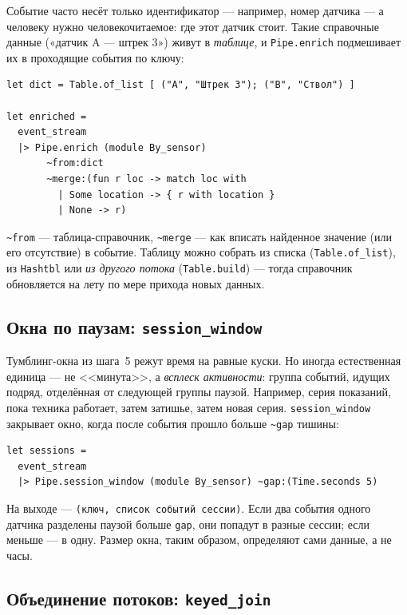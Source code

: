 \documentclass[11pt,a4paper]{article}
\begin{document}
Событие часто несёт только идентификатор --- например, номер датчика
--- а человеку нужно человекочитаемое: где этот датчик стоит. Такие
справочные данные («датчик A --- штрек 3») живут в \emph{таблице}, и
\texttt{Pipe.enrich} подмешивает их в проходящие события по ключу:

\begin{lstlisting}
let dict = Table.of_list [ ("A", "Штрек 3"); ("B", "Ствол") ]

let enriched =
  event_stream
  |> Pipe.enrich (module By_sensor)
       ~from:dict
       ~merge:(fun r loc -> match loc with
         | Some location -> { r with location }
         | None -> r)
\end{lstlisting}

\texttt{\textasciitilde{}from} --- таблица-справочник, \texttt{\textasciitilde{}merge}
--- как вписать найденное значение (или его отсутствие) в событие.
Таблицу можно собрать из списка (\texttt{Table.of\_list}), из
\texttt{Hashtbl} или \emph{из другого потока} (\texttt{Table.build}) ---
тогда справочник обновляется на лету по мере прихода новых данных.

\subsection{Окна по паузам: \texttt{session\_window}}

Тумблинг-окна из шага~5 режут время на равные куски. Но иногда
естественная единица --- не <<минута>>, а \emph{всплеск активности}:
группа событий, идущих подряд, отделённая от следующей группы паузой.
Например, серия показаний, пока техника работает, затем затишье, затем
новая серия. \texttt{session\_window} закрывает окно, когда после
события прошло больше \texttt{\textasciitilde{}gap} тишины:

\begin{lstlisting}
let sessions =
  event_stream
  |> Pipe.session_window (module By_sensor) ~gap:(Time.seconds 5)
\end{lstlisting}

На выходе --- \texttt{(ключ, список событий сессии)}. Если два события
одного датчика разделены паузой больше \texttt{gap}, они попадут в
разные сессии; если меньше --- в одну. Размер окна, таким образом,
определяют сами данные, а не часы.

\subsection{Объединение потоков: \texttt{keyed\_join}}
\end{document}

